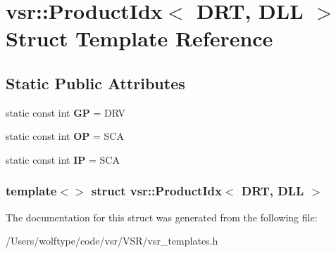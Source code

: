\hypertarget{structvsr_1_1_product_idx_3_01_d_r_t_00_01_d_l_l_01_4}{\section{vsr\-:\-:Product\-Idx$<$ D\-R\-T, D\-L\-L $>$ Struct Template Reference}
\label{structvsr_1_1_product_idx_3_01_d_r_t_00_01_d_l_l_01_4}
}
\subsection*{Static Public Attributes}
\begin{DoxyCompactItemize}
\item 
\hypertarget{structvsr_1_1_product_idx_3_01_d_r_t_00_01_d_l_l_01_4_a160f474855503f95e6f374a8cc1b113c}{static const int {\bfseries G\-P} = D\-R\-V}\label{structvsr_1_1_product_idx_3_01_d_r_t_00_01_d_l_l_01_4_a160f474855503f95e6f374a8cc1b113c}

\item 
\hypertarget{structvsr_1_1_product_idx_3_01_d_r_t_00_01_d_l_l_01_4_a49ef9b37089f28da391cfb873f35ae4e}{static const int {\bfseries O\-P} = S\-C\-A}\label{structvsr_1_1_product_idx_3_01_d_r_t_00_01_d_l_l_01_4_a49ef9b37089f28da391cfb873f35ae4e}

\item 
\hypertarget{structvsr_1_1_product_idx_3_01_d_r_t_00_01_d_l_l_01_4_ab1a63f8da64ebffe045ea7b85db4969a}{static const int {\bfseries I\-P} = S\-C\-A}\label{structvsr_1_1_product_idx_3_01_d_r_t_00_01_d_l_l_01_4_ab1a63f8da64ebffe045ea7b85db4969a}

\end{DoxyCompactItemize}
\subsubsection*{template$<$$>$ struct vsr\-::\-Product\-Idx$<$ D\-R\-T, D\-L\-L $>$}



The documentation for this struct was generated from the following file\-:\begin{DoxyCompactItemize}
\item 
/\-Users/wolftype/code/vsr/\-V\-S\-R/vsr\-\_\-templates.\-h\end{DoxyCompactItemize}
